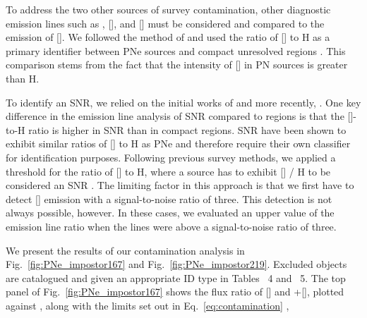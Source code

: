 \documentclass{aa}
\begin{document}
To address the two other sources of survey contamination, other diagnostic emission lines such as , [], and [] must be considered and compared to the emission of []. We followed the method of \citet{kreckel_revised_2017} and used the ratio of [] to H as a primary identifier between PNe sources and compact unresolved  regions \citep[Eq.~\ref{eq:contamination}, see also][]{ciardullo_planetary_2002, herrmann_planetary_2008, davis_planetary_2018}. This comparison stems from the fact that the intensity of [] in PN sources is greater than H.

To identify an SNR, we relied on the initial works of \citet{riesgo_revised_2006} and more recently, \citet{kreckel_revised_2017}. One key difference in the emission line analysis of SNR compared to  regions is that the []-to-H ratio is higher in SNR than in compact  regions. SNR have been shown to exhibit similar ratios of [] to H as PNe \citep{davis_planetary_2018} and therefore require their own classifier for identification purposes. Following previous survey methods, we applied a threshold for the ratio of [] to H, where a source has to exhibit [] / H to be considered an SNR \citep{blair_optical_2004}. The limiting factor in this approach is that we first have to detect [] emission with a signal-to-noise ratio of three. This detection is not always possible, however. In these cases, we evaluated an upper value of the emission line ratio when the lines were above a signal-to-noise ratio of three. 


We present the results of our contamination analysis in Fig.~\ref{fig:PNe_impostor167} and Fig.~\ref{fig:PNe_impostor219}. Excluded objects are catalogued and given an appropriate ID type in Tables ~4 and ~5. The top panel of Fig.~\ref{fig:PNe_impostor167} shows the flux ratio of [] and +[], plotted against , along with the limits set out in Eq.~\ref{eq:contamination} \citep{ciardullo_planetary_2002},
\end{document}
